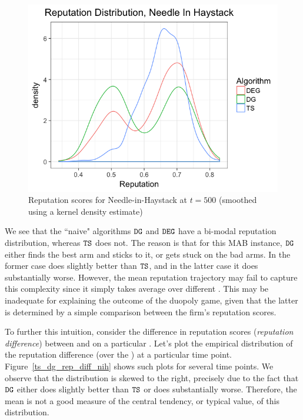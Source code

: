 \documentclass[../competing_bandits_with_appendix.tex]{subfiles}
\begin{document}
\begin{figure}[ht]
\includegraphics[scale=0.35]{figures/rep_distribution_nih}
\caption{Reputation scores for Needle-in-Haystack at $t=500$ (smoothed using a kernel density estimate)}
\label{rep_dist_nih}
\end{figure}


We see that the ``naive" algorithms $\mathtt{DG}$ and $\mathtt{DEG}$ have a bi-modal reputation distribution, whereas $\mathtt{TS}$ does not. The reason is that for this MAB instance, $\mathtt{DG}$ either finds the best arm and sticks to it, or gets stuck on the bad arms. In the former case \DG does slightly better than $\mathtt{TS}$, and in the latter case it does substantially worse. However, the mean reputation trajectory may fail to capture this complexity since it simply takes average over different \MRVs. This may be inadequate for explaining the outcome of the duopoly game, given that the latter is determined by a simple comparison between the firm's reputation scores.

To further this intuition, consider the difference in reputation scores (\emph{reputation difference}) between \TS and \DG on a particular \MRV. Let's plot the empirical distribution of the reputation difference (over the \MRVs) at a particular time point. Figure~\ref{ts_dg_rep_diff_nih} shows such plots for several time points. We observe that the distribution is skewed to the right, precisely due to the fact that $\mathtt{DG}$ either does slightly better than $\mathtt{TS}$ or does substantially worse. Therefore, the mean is not a good measure of the central tendency, or typical value, of this distribution.
\end{document}
